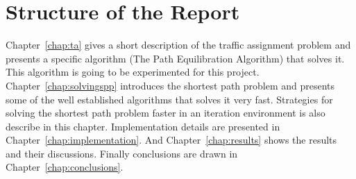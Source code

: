 \begin{comment}
The algorithm that are going to be tested are:
\begin{itemize}
    \item Bellman-Ford Label Correcting Algorithm,
    \item Dijkstra Label Setting Algorithm (using different data structures),
    \item Bidirectional Dijkstra,
    \item A* Search,
    \item Bidirectional A* search.
\end{itemize}

This project also aims to find and discuss techniques that can speed shortest path calculations in an iterative environment:
\begin{itemize}
    \item network preprocessing,
    \item using information from the previous iteration for the current iteration to avoid recalculating shortest paths that are not going to change.
\end{itemize}
\end{comment}

\section{Structure of the Report}
Chapter~\ref{chap:ta} gives a short description of the traffic assignment problem
and presents a specific algorithm (The Path Equilibration Algorithm) that solves it.
This algorithm is going to be experimented for this project.
Chapter~\ref{chap:solvingspp} introduces the shortest path problem and presents some of the well established algorithms that solves it very fast.
Strategies for solving the shortest path problem faster in an iteration environment is also describe in this chapter.
Implementation details are presented in Chapter~\ref{chap:implementation}.
And Chapter~\ref{chap:results} shows the results and their discussions.
Finally conclusions are drawn in Chapter~\ref{chap:conclusions}.
